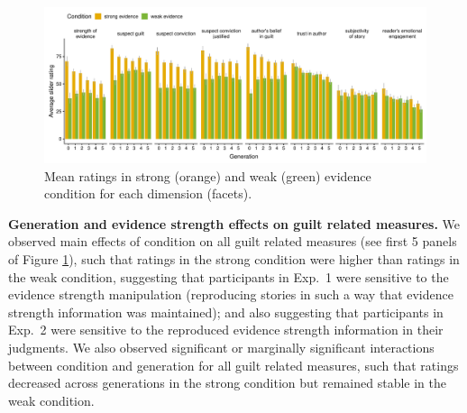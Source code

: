 \documentclass[10pt,letterpaper]{article}
\begin{document}
\begin{figure}[]
	\includegraphics[width=\textwidth]{pics/subj_results_byquestion.pdf}
	\caption{Mean ratings in strong (orange) and weak (green) evidence condition for each dimension (facets).} 
	\label{fig:exp2results}
\end{figure}

\textbf{Generation and evidence strength effects on guilt related measures.} We observed  main effects of condition on all guilt related measures (see first 5 panels of Figure \ref{fig:exp2results}), such that ratings in the strong condition were higher than ratings in the weak condition, suggesting that participants in Exp.~1 were sensitive to the evidence strength manipulation (reproducing stories in such a way that evidence strength information was maintained); and also suggesting that participants in Exp.~2 were sensitive to the reproduced evidence strength information in their judgments. %
We also observed significant or marginally significant interactions between condition and generation for all guilt related measures, such that ratings decreased across generations in the strong condition but remained stable in the weak condition. 
\end{document}
